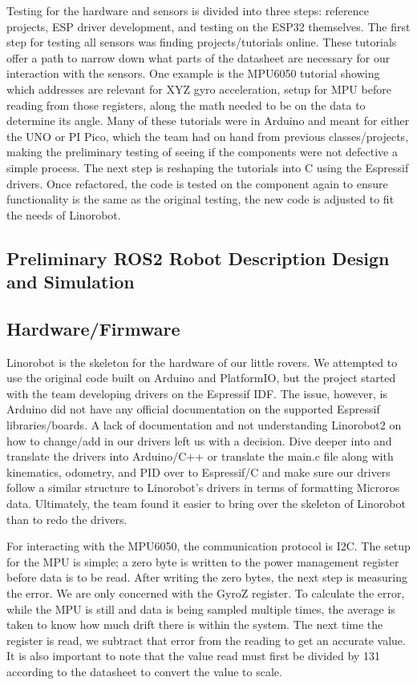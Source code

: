 \documentclass[conference]{IEEEtran}
\begin{document}
Testing for the hardware and sensors is divided into three steps: reference projects, ESP driver development, and testing on the ESP32 themselves. The first step for testing all sensors was finding projects/tutorials online. These tutorials offer a path to narrow down what parts of the datasheet are necessary for our interaction with the sensors. One example is the MPU6050 tutorial showing which addresses are relevant for XYZ gyro acceleration, setup for MPU before reading from those registers, along the math needed to be on the data to determine its angle. Many of these tutorials were in Arduino and meant for either the UNO or PI Pico, which the team had on hand from previous classes/projects, making the preliminary testing of seeing if the components were not defective a simple process. The next step is reshaping the tutorials into C using the Espressif drivers. Once refactored, the code is tested on the component again to ensure functionality is the same as the original testing, the new code is adjusted to fit the needs of Linorobot.





\subsection{Preliminary ROS2 Robot Description Design and Simulation}

\subsection{Hardware/Firmware}
Linorobot is the skeleton for the hardware of our little rovers. We attempted to use the original code built on Arduino and PlatformIO, but the project started with the team developing drivers on the Espressif IDF. The issue, however, is Arduino did not have any official documentation on the supported Espressif libraries/boards. A lack of documentation and not understanding Linorobot2 on how to change/add in our drivers left us with a decision. Dive deeper into and translate the drivers into Arduino/C++ or translate the main.c file along with kinematics, odometry, and PID over to Espressif/C and make sure our drivers follow a similar structure to Linorobot’s drivers in terms of formatting Microros data. Ultimately, the team found it easier to bring over the skeleton of Linorobot than to redo the drivers.

 For interacting with the MPU6050, the communication protocol is I2C. The setup for the MPU is simple; a zero byte is written to the power management register before data is to be read. After writing the zero bytes, the next step is measuring the error. We are only concerned with the GyroZ register. To calculate the error, while the MPU is still and data is being sampled multiple times, the average is taken to know how much drift there is within the system. The next time the register is read, we subtract that error from the reading to get an accurate value. It is also important to note that the value read must first be divided by 131 according to the datasheet to convert the value to scale.
 
\end{document}
